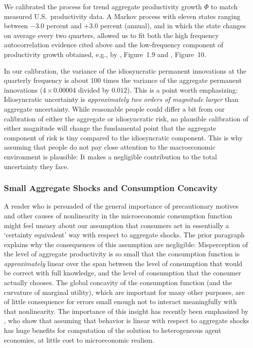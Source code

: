 \documentclass[titlepage]{article}
\begin{document}
We calibrated the process for trend aggregate productivity growth $\Phi$ to match measured U.S.\ productivity data.  A Markov process with eleven states ranging between $-3.0$ percent and $+3.0$ percent (annual), and in which the state changes on average every two quarters, allowed us to fit both the high frequency autocorrelation evidence cited above and the low-frequency component of productivity growth obtained, e.g., by \cite{sswNAIRU}, Figure~1.9 and \cite{fernald:disappointingRecovery}, Figure~10.

In our calibration, the variance of the idiosyncratic permanent innovations at the quarterly frequency is about 100 times the variance of the aggregate permanent innovations ($4 \times $0.00004 divided by $%
0.012 %
 $).  This is a point worth emphasizing: Idiosyncratic uncertainty is {\it approximately two orders of magnitude larger} than aggregate uncertainty.  While reasonable people could differ a bit from our calibration of either the aggregate or idiosyncratic risk, no plausible calibration of either magnitude will change the fundamental point that the aggregate component of risk is tiny compared to the idiosyncratic component.  This is why assuming that people do not pay close attention to the macroeconomic environment is plausible: It makes a negligible contribution to the total uncertainty they face.

\subsubsection{Small Aggregate Shocks and Consumption Concavity}
A reader who is persuaded of the general importance of precautionary motives and other causes of nonlinearity in the microeconomic consumption function might feel uneasy about our assumption that consumers act in essentially a `certainty equivalent' way with respect to aggregate shocks.  The prior paragraph explains why the consequences of this assumption are negligible: Misperception of the level of aggregate productivity is so small that the consumption function is \textit{approximately} linear over the span between the level of consumption that would be correct with full knowledge, and the level of consumption that the consumer actually chooses.  The global concavity of the consumption function (and the curvature of marginal utility), which are important for many other purposes, are of little consequence for errors small enough not to interact meaningfully with that nonlinearity.  The importance of this insight has recently been emphasized by \cite{bmpMITshocks}, who show that assuming that behavior is linear with respect to aggregate shocks has huge benefits for computation of the solution to heterogeneous agent economies, at little cost to microeconomic realism.
\end{document}
